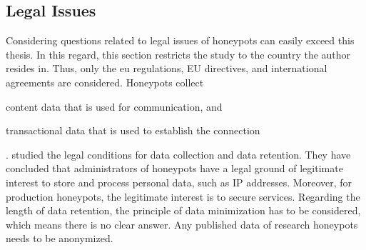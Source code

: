 \subsection{Legal Issues}

Considering questions related to legal issues of honeypots can easily exceed this thesis.
In this regard, this section restricts the study to the country the author resides in.
Thus, only the \ac{eu} regulations, EU directives, and international agreements are considered.
Honeypots collect
\begin{enumerate*}[label=(\roman*)]
    \item content data that is used for communication, and
    \item transactional data that is used to establish the connection
\end{enumerate*}.
\citet{sokol2017} studied the legal conditions for data collection and data retention.
They have concluded that administrators of honeypots have a legal ground of legitimate interest to store and process personal data, such as IP addresses.
Moreover, for production honeypots, the legitimate interest is to secure services.
Regarding the length of data retention, the principle of data minimization has to be considered, which means there is no clear answer.
Any published data of research honeypots needs to be anonymized.
